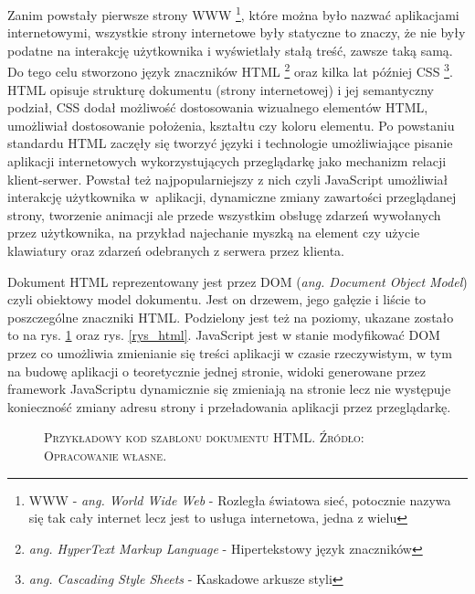 \documentclass[12pt,a4paper,oneside]{book}
\newcommand{\captionT}[1]{\caption{\textsc{\footnotesize{#1}}}}
\begin{document}
Zanim powstały pierwsze strony WWW \footnote{WWW - \textit{ang. World Wide Web} - Rozległa światowa sieć, potocznie nazywa się tak cały internet lecz jest to usługa internetowa, jedna z wielu}, które można było nazwać  aplikacjami internetowymi, wszystkie strony internetowe były statyczne to znaczy, że nie były podatne na interakcję użytkownika i wyświetlały stałą treść, zawsze taką samą. Do tego celu stworzono język znaczników HTML \footnote{\textit{ang. HyperText Markup Language} - Hipertekstowy język znaczników} oraz kilka lat później CSS \footnote{\textit{ang. Cascading Style Sheets} - Kaskadowe arkusze styli}. HTML opisuje strukturę dokumentu (strony internetowej) i jej semantyczny podział, CSS dodał możliwość dostosowania wizualnego elementów HTML, umożliwiał dostosowanie położenia, kształtu czy koloru elementu. Po powstaniu standardu HTML zaczęły się tworzyć języki i technologie umożliwiające pisanie aplikacji internetowych wykorzystujących przeglądarkę jako mechanizm relacji klient-serwer. Powstał też najpopularniejszy z nich czyli JavaScript umożliwiał interakcję użytkownika w~aplikacji, dynamiczne zmiany zawartości przeglądanej strony, tworzenie animacji ale przede wszystkim obsługę zdarzeń wywołanych przez użytkownika, na przykład najechanie myszką na element czy użycie klawiatury oraz zdarzeń odebranych z serwera przez klienta.

Dokument HTML reprezentowany jest przez DOM (\textit{ang. Document Object Model}) czyli obiektowy model dokumentu. Jest on drzewem, jego gałęzie i liście to poszczególne znaczniki HTML. Podzielony jest też na poziomy, ukazane zostało to na rys. \ref{rys_basic_template} oraz rys. \ref{rys_html}. JavaScript jest w stanie modyfikować DOM przez co umożliwia zmienianie się treści aplikacji w czasie rzeczywistym, w tym na budowę aplikacji o teoretycznie jednej stronie, widoki generowane przez framework JavaScriptu dynamicznie się zmieniają na stronie lecz nie występuje konieczność zmiany adresu strony i przeładowania aplikacji przez przeglądarkę.

\begin{figure}[H]
\centering

\captionT{Przykładowy kod szablonu dokumentu HTML. Źródło: Opracowanie własne.}
\label{rys_basic_template}
\end{figure}
\end{document}
